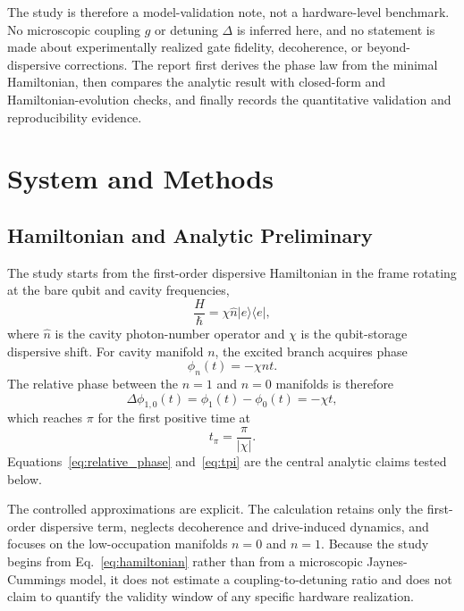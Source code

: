 \documentclass[aps,pra,twocolumn,reprint,amsmath,amssymb]{revtex4-2}
\begin{document}
The study is therefore a model-validation note, not a hardware-level benchmark. No microscopic coupling $g$ or detuning $\Delta$ is inferred here, and no statement is made about experimentally realized gate fidelity, decoherence, or beyond-dispersive corrections. The report first derives the phase law from the minimal Hamiltonian, then compares the analytic result with closed-form and Hamiltonian-evolution checks, and finally records the quantitative validation and reproducibility evidence.

\section{System and Methods}

\subsection{Hamiltonian and Analytic Preliminary}
The study starts from the first-order dispersive Hamiltonian in the frame rotating at the bare qubit and cavity frequencies,
\begin{equation}
\frac{H}{\hbar} = \chi \hat{n} |e\rangle\langle e|,
\label{eq:hamiltonian}
\end{equation}
where $\hat{n}$ is the cavity photon-number operator and $\chi$ is the qubit-storage dispersive shift. For cavity manifold $n$, the excited branch acquires phase
\begin{equation}
\phi_n(t) = -\chi n t.
\label{eq:branch_phase}
\end{equation}
The relative phase between the $n=1$ and $n=0$ manifolds is therefore
\begin{equation}
\Delta\phi_{1,0}(t) = \phi_1(t) - \phi_0(t) = -\chi t,
\label{eq:relative_phase}
\end{equation}
which reaches $\pi$ for the first positive time at
\begin{equation}
t_{\pi} = \frac{\pi}{|\chi|}.
\label{eq:tpi}
\end{equation}
Equations~\eqref{eq:relative_phase} and~\eqref{eq:tpi} are the central analytic claims tested below.

The controlled approximations are explicit. The calculation retains only the first-order dispersive term, neglects decoherence and drive-induced dynamics, and focuses on the low-occupation manifolds $n=0$ and $n=1$. Because the study begins from Eq.~\eqref{eq:hamiltonian} rather than from a microscopic Jaynes-Cummings model, it does not estimate a coupling-to-detuning ratio and does not claim to quantify the validity window of any specific hardware realization.
\end{document}
